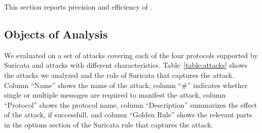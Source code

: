 \documentclass[conference]{IEEEtran}
\begin{document}


This section reports precision and efficiency of \tname.


\subsection{Objects of Analysis}

We evaluated \tname{} on a set of attacks covering each of the four
protocols supported by Suricata and attacks with different
characteristics. Table~\ref{table:attacks} shows the attacks we
analyzed and the rule of Suricata that captures the attack. Column
``Name'' shows the name of the attack, column ``\#'' indicates whether
single or multiple messages are required to manifest the attack,
column ``Protocol'' shows the protocol name, column ``Description''
summarizes the effect of the attack, if successfull, and column
``Golden Rule'' shows the relevant parts in the options section of the
Suricata rule that captures the attack.
\end{document}
